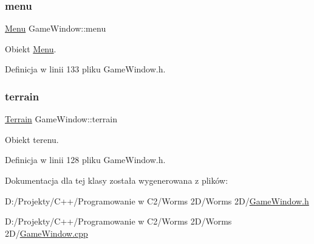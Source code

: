 \subsubsection{\texorpdfstring{menu}{menu}}
{\footnotesize\ttfamily \mbox{\hyperlink{class_menu}{Menu}} Game\+Window\+::menu}



Obiekt \mbox{\hyperlink{class_menu}{Menu}}. 



Definicja w linii 133 pliku Game\+Window.\+h.

\mbox{\label{class_game_window_ab5d02e9738d1f7f3fea4cd146172cf11}} 
\subsubsection{\texorpdfstring{terrain}{terrain}}
{\footnotesize\ttfamily \mbox{\hyperlink{class_terrain}{Terrain}} Game\+Window\+::terrain}



Obiekt terenu. 



Definicja w linii 128 pliku Game\+Window.\+h.



Dokumentacja dla tej klasy została wygenerowana z plików\+:\begin{DoxyCompactItemize}
\item 
D\+:/\+Projekty/\+C++/\+Programowanie w C2/\+Worms 2\+D/\+Worms 2\+D/\mbox{\hyperlink{_game_window_8h}{Game\+Window.\+h}}\item 
D\+:/\+Projekty/\+C++/\+Programowanie w C2/\+Worms 2\+D/\+Worms 2\+D/\mbox{\hyperlink{_game_window_8cpp}{Game\+Window.\+cpp}}\end{DoxyCompactItemize}
